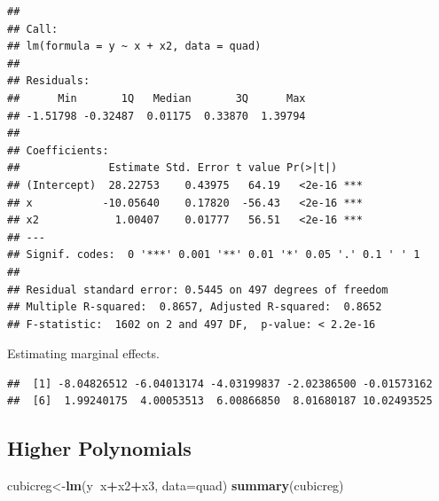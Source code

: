 \documentclass[]{book}
\newenvironment{Shaded}{\begin{snugshade}}{\end{snugshade}}
\newcommand{\KeywordTok}[1]{\textcolor[rgb]{0.13,0.29,0.53}{\textbf{#1}}}
\newcommand{\DataTypeTok}[1]{\textcolor[rgb]{0.13,0.29,0.53}{#1}}
\newcommand{\DecValTok}[1]{\textcolor[rgb]{0.00,0.00,0.81}{#1}}
\newcommand{\ControlFlowTok}[1]{\textcolor[rgb]{0.13,0.29,0.53}{\textbf{#1}}}
\newcommand{\OperatorTok}[1]{\textcolor[rgb]{0.81,0.36,0.00}{\textbf{#1}}}
\newcommand{\NormalTok}[1]{#1}
\theoremstyle{definition}
\theoremstyle{definition}
\theoremstyle{definition}
\theoremstyle{remark}
\begin{document}
\begin{verbatim}
## 
## Call:
## lm(formula = y ~ x + x2, data = quad)
## 
## Residuals:
##      Min       1Q   Median       3Q      Max 
## -1.51798 -0.32487  0.01175  0.33870  1.39794 
## 
## Coefficients:
##              Estimate Std. Error t value Pr(>|t|)    
## (Intercept)  28.22753    0.43975   64.19   <2e-16 ***
## x           -10.05640    0.17820  -56.43   <2e-16 ***
## x2            1.00407    0.01777   56.51   <2e-16 ***
## ---
## Signif. codes:  0 '***' 0.001 '**' 0.01 '*' 0.05 '.' 0.1 ' ' 1
## 
## Residual standard error: 0.5445 on 497 degrees of freedom
## Multiple R-squared:  0.8657, Adjusted R-squared:  0.8652 
## F-statistic:  1602 on 2 and 497 DF,  p-value: < 2.2e-16
\end{verbatim}

Estimating marginal effects.

\begin{Shaded}
\end{Shaded}

\begin{verbatim}
##  [1] -8.04826512 -6.04013174 -4.03199837 -2.02386500 -0.01573162
##  [6]  1.99240175  4.00053513  6.00866850  8.01680187 10.02493525
\end{verbatim}

\subsection{Higher Polynomials}\label{higher-polynomials}

\begin{Shaded}
\begin{Highlighting}[]
\NormalTok{cubicreg<-}\KeywordTok{lm}\NormalTok{(y}\OperatorTok{~}\NormalTok{x}\OperatorTok{+}\NormalTok{x2}\OperatorTok{+}\NormalTok{x3, }\DataTypeTok{data=}\NormalTok{quad)}
\KeywordTok{summary}\NormalTok{(cubicreg)}
\end{Highlighting}
\end{Shaded}
\end{document}
